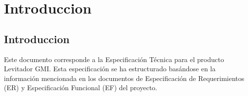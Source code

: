 \chapter{Introduccion}  \label{cap:Introduccion}

\section{Introduccion}

Este documento corresponde a la Especificación Técnica para el producto Levitador GMI.
Esta especificación se ha estructurado basándose en la información mencionada en los
documentos de Especificación de Requerimientos (ER) y Especificación Funcional (EF) del
proyecto.






